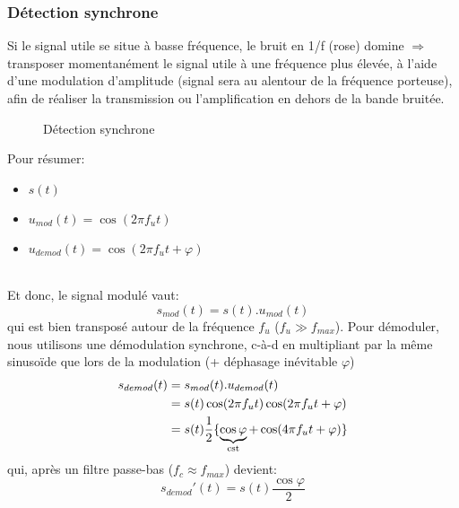 \subsubsection{Détection synchrone} \label{subsubsec:detectsync}
Si le signal utile se situe à basse fréquence, le bruit en 1/f (rose) domine \(\Rightarrow\) transposer momentanément le signal utile à une fréquence plus élevée, à l'aide d'une modulation d'amplitude (signal sera au alentour de la fréquence porteuse), afin de réaliser la transmission ou l'amplification en dehors de la bande bruitée. 
\begin{figure}[H] 
	\centering 
	\caption{Détection synchrone} 
\end{figure}
Pour résumer:
\begin{itemize}
		\item { \(s(t)\)}
		\item { \(u_{mod}(t)=\cos(2\pi f_ut)\)}
		\item { \(u_{demod}(t) = \cos(2\pi f_ut+\varphi)\)}
\end{itemize}\ \\
Et donc, le signal modulé vaut:
\begin{equation}
s_{mod}(t) = s(t) . u_{mod}(t)
\end{equation}
qui est bien transposé autour de la fréquence \(f_u\) (\(f_u\gg f_{max}\)). Pour démoduler, nous utilisons une démodulation synchrone, c-à-d en multipliant par la même sinusoïde que lors de la modulation (+ déphasage inévitable \(\varphi\))
\begin{equation}
\begin{split}
s_{demod}(t) &= s_{mod}(t) . u_{demod}(t)\\
&= s(t)\cos(2\pi f_u t)\cos(2\pi f_u t+\varphi)\\
&= s(t)\frac{1}{2}\{\underbrace{\cos\varphi}_{\text{cst}}+\cos(4\pi f_u t+\varphi)\}
\end{split}
\end{equation}
qui, après un filtre passe-bas (\(f_c \approx f_{max}\)) devient:
\begin{equation}
s_{demod}'(t) = s(t)\frac{\cos\varphi}{2}
\end{equation}
